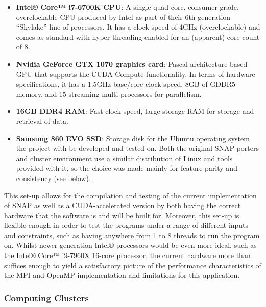 \documentclass[conference]{IEEEtran}
\begin{document}
\begin{itemize}
    \item \textbf{Intel® Core™ i7-6700K CPU}: A single quad-core, consumer-grade, overclockable CPU produced by Intel as part of their 6th generation ``Skylake'' line of processors. It has a clock speed of 4GHz (overclockable) and comes as standard with hyper-threading enabled for an (apparent) core count of 8.
    \item \textbf{Nvidia GeForce GTX 1070 graphics card}: Pascal architecture-based GPU that supports the CUDA Compute functionality. In terms of hardware specifications, it has a 1.5GHz base/core clock speed, 8GB of GDDR5 memory, and 15 streaming multi-processors for parallelism.
    \item \textbf{16GB DDR4 RAM}: Fast clock-speed, large storage RAM for storage and retrieval of data.
    \item \textbf{Samsung 860 EVO SSD}: Storage disk for the Ubuntu operating system the project with be developed and tested on. Both the original SNAP porters and cluster environment use a similar distribution of Linux and tools provided with it, so the choice was made mainly for feature-parity and consistency (see below).
\end{itemize}

This set-up allows for the compilation and testing of the current implementation of SNAP as well as a CUDA-accelerated version by both having the correct hardware that the software is and will be built for. Moreover, this set-up is flexible enough in order to test the programs under a range of different inputs and constraints, such as having anywhere from 1 to 8 threads to run the program on. Whilst newer generation Intel® processors would be even more ideal, such as the Intel® Core™ i9-7960X 16-core processor, the current hardware more than suffices enough to yield a satisfactory picture of the performance characteristics of the MPI and OpenMP implementation and limitations for this application.

\subsubsection{Computing Clusters}
\label{subsubsec:clusters}

\end{document}

